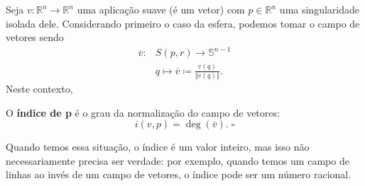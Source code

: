 \documentclass[../differential_topology.tex]{subfiles}
\begin{document}
Seja \(v:\mathbb{R}^{n}\rightarrow \mathbb{R}^{n}\) uma aplicação suave (é um vetor) com \(p\in \mathbb{R}^{n}\) uma singularidade isolada dele.
Considerando primeiro o caso da esfera, podemos tomar o campo de vetores sendo
\begin{align*}
	\overline{v}: & S(p, r)\rightarrow\mathbb{S}^{n-1}                                \\
	              & q\longmapsto \overline{v}\coloneqq \frac{v(q)}{\Vert v(q) \Vert}.
\end{align*}
Neste contexto,
\begin{def*}
	O \textbf{índice de p} é o grau da normalização do campo de vetores:
	\[
		i(v, p) = \deg{(\overline{v})}.\; \square
	\]
\end{def*}
Quando temos essa situação, o índice é um valor inteiro, mas isso não necessariamente precisa ser verdade: por exemplo, quando temos um campo de linhas ao invés de um campo de vetores, o índice pode ser um número racional.
\end{document}
